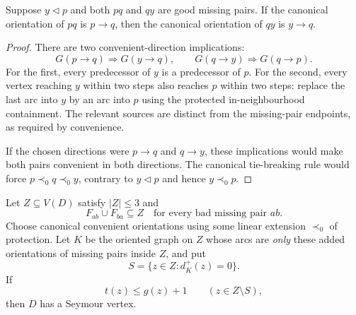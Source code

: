 \begin{lemma}
\label{lem:canonical-convenient-compatibility}
Suppose $y\triangleleft p$ and both $pq$ and $qy$ are good missing
pairs. If the canonical orientation of $pq$ is $p\to q$, then the
canonical orientation of $qy$ is $y\to q$.
\end{lemma}
\begin{proof}
There are two convenient-direction implications:
\[
 G(p\to q)\Longrightarrow G(y\to q),
 \qquad
 G(q\to y)\Longrightarrow G(q\to p).
\]
For the first, every predecessor of $y$ is a predecessor of $p$.
For the second, every vertex reaching $y$ within two steps also
reaches $p$ within two steps: replace the last arc into $y$ by an arc
into $p$ using the protected in-neighbourhood containment. The relevant
sources are distinct from the missing-pair endpoints, as required
by convenience.

If the chosen directions were $p\to q$ and $q\to y$, these implications
would make both pairs convenient in both directions. The canonical
tie-breaking rule would force $p\prec_0 q\prec_0 y$, contrary to
$y\triangleleft p$ and hence $y\prec_0 p$.
\end{proof}

\begin{lemma}
\label{lem:small-failure-sources}
Let $Z\subseteq V(D)$ satisfy $|Z|\le3$ and
\[
 F_{ab}\cup F_{ba}\subseteq Z
 \quad\text{for every bad missing pair }ab.
\]
Choose canonical convenient orientations using some linear extension
$\prec_0$ of protection. Let $K$ be the oriented graph on $Z$ whose
arcs are \emph{only} these added orientations of missing pairs inside
$Z$, and put
\[
 S=\{z\in Z:d_K^+(z)=0\}.
\]
If
\[
 t(z)\le g(z)+1\qquad(z\in Z\setminus S),
 \tag{SF1}\label{eq:small-source-budget}
\]
then $D$ has a Seymour vertex.
\end{lemma}

